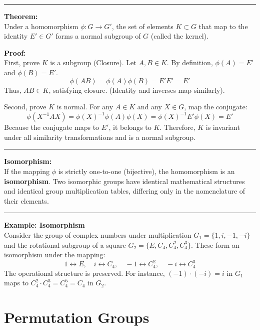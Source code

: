 \documentclass[11pt, a4paper]{report}
\begin{document}
\vspace{1em}
\hrule
\vspace{1em}

\textbf{Theorem:} \\
Under a homomorphism $\phi: G \to G'$, the set of elements $K \subset G$ that map to the identity $E' \in G'$ forms a normal subgroup of $G$ (called the kernel).

\vspace{0.5em}
\textbf{Proof:} \\
First, prove $K$ is a subgroup (Closure). Let $A, B \in K$. By definition, $\phi(A) = E'$ and $\phi(B) = E'$.
\[ \phi(AB) = \phi(A)\phi(B) = E' E' = E' \]
Thus, $AB \in K$, satisfying closure. (Identity and inverses map similarly).

Second, prove $K$ is normal. For any $A \in K$ and any $X \in G$, map the conjugate:
\[ \phi(X^{-1} A X) = \phi(X)^{-1} \phi(A) \phi(X) = \phi(X)^{-1} E' \phi(X) = E' \]
Because the conjugate maps to $E'$, it belongs to $K$. Therefore, $K$ is invariant under all similarity transformations and is a normal subgroup.

\vspace{1em}
\hrule
\vspace{1em}

\textbf{Isomorphism:} \\
If the mapping $\phi$ is strictly one-to-one (bijective), the homomorphism is an \textbf{isomorphism}. Two isomorphic groups have identical mathematical structures and identical group multiplication tables, differing only in the nomenclature of their elements.

\vspace{1em}
\hrule
\vspace{1em}

\textbf{Example: Isomorphism} \\
Consider the group of complex numbers under multiplication $G_1 = \{1, i, -1, -i\}$ and the rotational subgroup of a square $G_2 = \{E, C_4, C_4^2, C_4^3\}$. These form an isomorphism under the mapping:
\[ 1 \leftrightarrow E, \quad i \leftrightarrow C_4, \quad -1 \leftrightarrow C_4^2, \quad -i \leftrightarrow C_4^3 \]
The operational structure is preserved. For instance, $(-1) \cdot (-i) = i$ in $G_1$ maps to $C_4^2 \cdot C_4^3 = C_4^5 = C_4$ in $G_2$.

\section{Permutation Groups}
\end{document}
